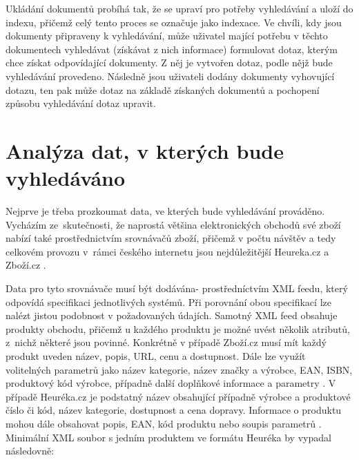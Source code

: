 \documentclass[FM,DP]{tulthesis}
\begin{document}
Ukládání dokumentů probíhá tak, že se upraví pro potřeby vyhledávání a uloží 
do indexu, přičemž celý tento proces se označuje jako indexace. Ve chvíli, kdy jsou
dokumenty připraveny k vyhledávání, může uživatel mající potřebu v těchto dokumentech 
vyhledávat (získávat z nich informace) formulovat dotaz, kterým chce získat odpovídající
dokumenty. Z něj je vytvořen dotaz, podle nějž bude vyhledávání provedeno. Následně
jsou uživateli dodány dokumenty vyhovující dotazu, ten pak může dotaz na základě
získaných dokumentů a pochopení způsobu vyhledávání dotaz upravit.

\section{Analýza dat, v kterých bude vyhledáváno}

Nejprve je třeba prozkoumat data, ve kterých bude vyhledávání prováděno. Vycházím
ze~skutečnosti, že naprostá většina elektronických obchodů své zboží nabízí také 
prostřednictvím srovnávačů zboží, přičemž v počtu návštěv a tedy celkovém provozu 
v~rámci českého internetu jsou nejdůležitější Heureka.cz a Zboží.cz \cite{netmonitor}. 

Data pro tyto srovnávače musí být dodávána- prostředníctvím XML feedu, který odpovídá 
specifikaci jednotlivých systémů. Při porovnání obou specifikací lze nalézt 
jistou podobnost v požadovaných údajích. Samotný XML feed obsahuje
produkty obchodu, přičemž u každého produktu je možné uvést několik atributů, z~nichž
některé jsou povinné. Konkrétně v případě Zboží.cz musí mít každý produkt uveden název, 
popis, URL, cenu a dostupnost. Dále lze využít volitelných parametrů jako název kategorie, 
název značky a výrobce, EAN, ISBN, produktový kód výrobce, případně další doplňkové
informace a parametry \cite{xml-zbozi}. V případě Heuréka.cz je podstatný název
obsahující případně výrobce a produktové číslo či kód, název kategorie, dostupnost a
cena dopravy. Informace o produktu mohou dále obsahovat popis, EAN, kód produktu
nebo soupis parametrů \cite{xml-heureka}. Minimální XML soubor s jedním produktem 
ve formátu Heuréka by vypadal následovně:
\end{document}
